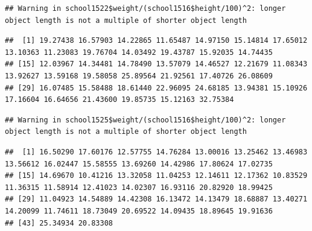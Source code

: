 \documentclass[
  12pt,
]{book}
\newenvironment{Shaded}{\begin{snugshade}}{\end{snugshade}}
\newcommand{\DecValTok}[1]{\textcolor[rgb]{0.00,0.00,0.81}{#1}}
\newcommand{\DocumentationTok}[1]{\textcolor[rgb]{0.56,0.35,0.01}{\textbf{\textit{#1}}}}
\newcommand{\NormalTok}[1]{#1}
\newcommand{\SpecialCharTok}[1]{\textcolor[rgb]{0.00,0.00,0.00}{#1}}
\begin{document}
\begin{Shaded}
\end{Shaded}

\begin{verbatim}
## Warning in school1522$weight/(school1516$height/100)^2: longer object length is not a multiple of shorter object length
\end{verbatim}

\begin{verbatim}
##  [1] 19.27438 16.57903 14.22865 11.65487 14.97150 15.14814 17.65012 13.10363 11.23083 19.76704 14.03492 19.43787 15.92035 14.74435
## [15] 12.03967 14.34481 14.78490 13.57079 14.46527 12.21679 11.08343 13.92627 13.59168 19.58058 25.89564 21.92561 17.40726 26.08609
## [29] 16.07485 15.58488 18.61440 22.96095 24.68185 13.94381 15.10926 17.16604 16.64656 21.43600 19.85735 15.12163 32.75384
\end{verbatim}

\begin{Shaded}
\end{Shaded}

\begin{verbatim}
## Warning in school1525$weight/(school1516$height/100)^2: longer object length is not a multiple of shorter object length
\end{verbatim}

\begin{verbatim}
##  [1] 16.50290 17.60176 12.57755 14.76284 13.00016 13.25462 13.46983 13.56612 16.02447 15.58555 13.69260 14.42986 17.80624 17.02735
## [15] 14.69670 10.41216 13.32058 11.04253 12.14611 12.17362 10.83529 11.36315 11.58914 12.41023 14.02307 16.93116 20.82920 18.99425
## [29] 11.04923 14.54889 14.42308 16.13472 14.13479 18.68887 13.40271 14.20099 11.74611 18.73049 20.69522 14.09435 18.89645 19.91636
## [43] 25.34934 20.83308
\end{verbatim}
\end{document}
